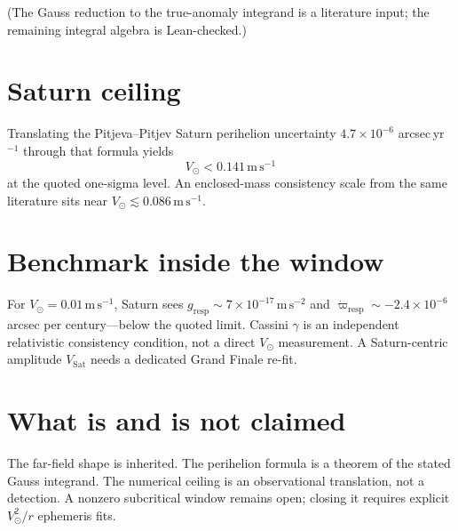 \documentclass[11pt]{article}
\theoremstyle{definition}
\theoremstyle{remark}
\begin{document}
(The Gauss reduction to the true-anomaly integrand is a literature input; the remaining integral algebra is Lean-checked.)

\section{Saturn ceiling}
Translating the Pitjeva--Pitjev Saturn perihelion uncertainty $4.7\times10^{-6}$ arcsec\,yr$^{-1}$ through that formula yields
\[
  V_\odot<0.141\,\mathrm{m\,s^{-1}}
\]
at the quoted one-sigma level.
An enclosed-mass consistency scale from the same literature sits near $V_\odot\lesssim0.086\,\mathrm{m\,s^{-1}}$.

\section{Benchmark inside the window}
For $V_\odot=0.01\,\mathrm{m\,s^{-1}}$, Saturn sees
$g_{\mathrm{resp}}\sim7\times10^{-17}\,\mathrm{m\,s^{-2}}$ and
$\dot\varpi_{\mathrm{resp}}\sim-2.4\times10^{-6}$ arcsec per century---below the quoted limit.
Cassini $\gamma$ is an independent relativistic consistency condition, not a direct $V_\odot$ measurement.
A Saturn-centric amplitude $V_{\mathrm{Sat}}$ needs a dedicated Grand Finale re-fit.

\section{What is and is not claimed}
The far-field shape is inherited.
The perihelion formula is a theorem of the stated Gauss integrand.
The numerical ceiling is an observational translation, not a detection.
A nonzero subcritical window remains open; closing it requires explicit $V_\odot^{2}/r$ ephemeris fits.
\end{document}
